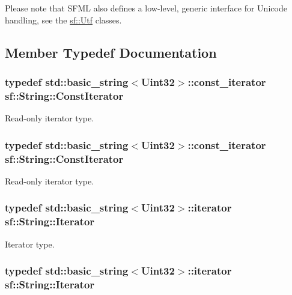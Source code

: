 Please note that S\-F\-M\-L also defines a low-\/level, generic interface for Unicode handling, see the \hyperlink{classsf_1_1_utf}{sf\-::\-Utf} classes. 

\subsection{Member Typedef Documentation}
\hypertarget{classsf_1_1_string_a8e18efc2e8464f6eb82818902d527efa}{
\subsubsection[{Const\-Iterator}]{\setlength{\rightskip}{0pt plus 5cm}typedef std\-::basic\-\_\-string$<${\bf Uint32}$>$\-::const\-\_\-iterator {\bf sf\-::\-String\-::\-Const\-Iterator}}}\label{classsf_1_1_string_a8e18efc2e8464f6eb82818902d527efa}


Read-\/only iterator type. 

\hypertarget{classsf_1_1_string_a8e18efc2e8464f6eb82818902d527efa}{
\subsubsection[{Const\-Iterator}]{\setlength{\rightskip}{0pt plus 5cm}typedef std\-::basic\-\_\-string$<${\bf Uint32}$>$\-::const\-\_\-iterator {\bf sf\-::\-String\-::\-Const\-Iterator}}}\label{classsf_1_1_string_a8e18efc2e8464f6eb82818902d527efa}


Read-\/only iterator type. 

\hypertarget{classsf_1_1_string_ac90f2b7b28f703020f8d027e98806235}{
\subsubsection[{Iterator}]{\setlength{\rightskip}{0pt plus 5cm}typedef std\-::basic\-\_\-string$<${\bf Uint32}$>$\-::iterator {\bf sf\-::\-String\-::\-Iterator}}}\label{classsf_1_1_string_ac90f2b7b28f703020f8d027e98806235}


Iterator type. 

\hypertarget{classsf_1_1_string_ac90f2b7b28f703020f8d027e98806235}{
\subsubsection[{Iterator}]{\setlength{\rightskip}{0pt plus 5cm}typedef std\-::basic\-\_\-string$<${\bf Uint32}$>$\-::iterator {\bf sf\-::\-String\-::\-Iterator}}}\label{classsf_1_1_string_ac90f2b7b28f703020f8d027e98806235}


